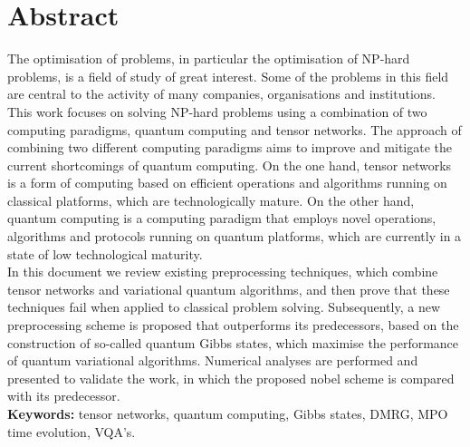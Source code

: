 \chapter{Abstract}

The optimisation of problems, in particular the optimisation of NP-hard problems, is a field of study of great interest. Some of the problems in this field are central to the activity of many companies, organisations and institutions. \\

This work focuses on solving NP-hard problems using a combination of two computing paradigms, quantum computing and tensor networks. The approach of combining two different computing paradigms aims to improve and mitigate the current shortcomings of quantum computing. On the one hand, tensor networks is a form of computing based on efficient operations and algorithms running on classical platforms, which are technologically mature. On the other hand, quantum computing is a computing paradigm that employs novel operations, algorithms and protocols running on quantum platforms, which are currently in a state of low technological maturity. \\

In this document we review existing preprocessing techniques, which combine tensor networks and variational quantum algorithms, and then prove that these techniques fail when applied to classical problem solving. Subsequently, a new preprocessing scheme is proposed that outperforms its predecessors, based on the construction of so-called quantum Gibbs states, which maximise the performance of quantum variational algorithms. Numerical analyses are performed and presented to validate the work, in which the proposed nobel scheme is compared with its predecessor. \\



{\bf Keywords:} tensor networks, quantum computing, Gibbs states, DMRG, MPO time evolution, VQA's.